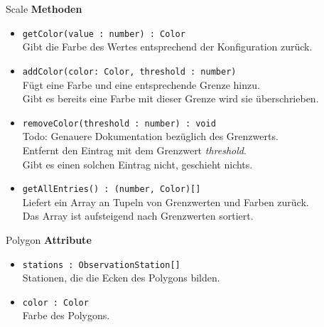     \begin{Class}{Scale}
        \textbf{Methoden}
        \begin{itemize}
            \item \texttt{getColor(value : number) : Color}
            \\ Gibt die Farbe des Wertes entsprechend der Konfiguration zurück.
            \item \texttt{addColor(color: Color, threshold : number)}
            \\ Fügt eine Farbe und eine entsprechende Grenze hinzu.
            \\ Gibt es bereits eine Farbe mit dieser Grenze wird sie überschrieben.
            \item \texttt{removeColor(threshold : number) : void}
            \\ Todo: Genauere Dokumentation bezüglich des Grenzwerts. 
            \\ Entfernt den Eintrag mit dem Grenzwert \emph{threshold}.
            \\ Gibt es einen solchen Eintrag nicht, geschieht nichts.
            \item \texttt{getAllEntries() : (number, Color)[]}
            \\ Liefert ein Array an Tupeln von Grenzwerten und Farben zurück.
            \\ Das Array ist aufsteigend nach Grenzwerten sortiert.
        \end{itemize}
    \end{Class}

    \begin{Class}{Polygon}
        \textbf{Attribute}
        \begin{itemize}
            \item \texttt{stations : ObservationStation[]}
            \\ Stationen, die die Ecken des Polygons bilden.
            \item \texttt{color : Color}
            \\ Farbe des Polygons.
        \end{itemize}
    \end{Class}

